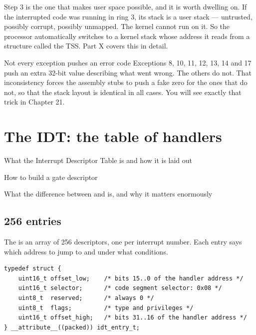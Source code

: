 Step 3 is the one that makes user space possible, and it is worth dwelling on. If the interrupted
code was running in ring 3, its stack is a user stack --- untrusted, possibly corrupt, possibly
unmapped. The kernel cannot run on it. So the processor automatically switches to a kernel stack
whose address it reads from a structure called the TSS. Part X covers this in detail.

\begin{warn}{Not every exception pushes an error code}
Exceptions 8, 10, 11, 12, 13, 14 and 17 push an extra 32-bit value describing what went wrong. The
others do not. That inconsistency forces the assembly stubs to push a fake zero for the ones that
do not, so that the stack layout is identical in all cases. You will see exactly that trick in
Chapter 21.
\end{warn}

\chapter{The IDT: the table of handlers}

\begin{goals}
  \item What the Interrupt Descriptor Table is and how it is laid out
  \item How to build a gate descriptor
  \item What the difference between  and  is, and why it matters enormously
\end{goals}

\section{256 entries}

The  is an array of 256 descriptors, one per interrupt number. Each entry says which
address to jump to and under what conditions.

\begin{lstlisting}[style=c]
typedef struct {
    uint16_t offset_low;    /* bits 15..0 of the handler address */
    uint16_t selector;      /* code segment selector: 0x08 */
    uint8_t  reserved;      /* always 0 */
    uint8_t  flags;         /* type and privileges */
    uint16_t offset_high;   /* bits 31..16 of the handler address */
} __attribute__((packed)) idt_entry_t;
\end{lstlisting}


